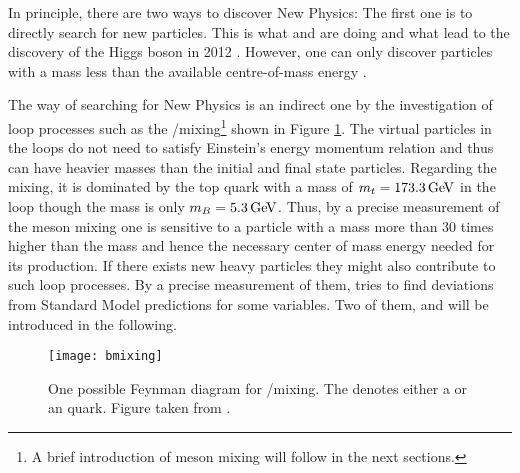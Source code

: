In principle, there are two ways to discover New Physics:
The first one is to directly search for new particles.
This is what \atlas and \cms are doing and what lead to the discovery of the Higgs boson in 2012 \cite{Higgs_ATLAS, Higgs_CMS}.
However, one can only discover particles with a mass less than the available centre-of-mass energy \sqs.

The \lhcb way of searching for New Physics is an indirect one by the investigation of loop processes such as the \B/\Bbar mixing\footnote{A brief introduction of meson mixing will follow in the next sections.} shown in Figure \ref{fig:Bmixing}.
The virtual particles in the loops do not need to satisfy Einstein's energy momentum relation and thus can have heavier masses than the initial and final state particles.
Regarding the \B mixing, it is dominated by the top quark with a mass of $m_t = 173.3 \mathrm{\,Ge\kern -0.1em V}$ in the loop though the \B mass is only $m_{B} = 5.3\mathrm{\,Ge\kern -0.1em V}$.
Thus, by a precise measurement of the \B meson mixing one is sensitive to a particle with a mass more than 30 times higher than the \B mass and hence the necessary center of mass energy needed for its production.
If there exists new heavy particles they might also contribute to such loop processes.
By a precise measurement of them, \lhcb tries to find deviations from Standard Model predictions for some variables.
Two of them, \asld and \Vub will be introduced in the following.
\begin{figure}[ptb]
    \centering
	\texttt{[image: bmixing]}	
	\caption{One possible Feynman diagram for \B/\Bbar mixing. The \quark denotes either a \dquark or an \squark quark. Figure taken from \cite{LHCb_roadmap}.}
	\label{fig:Bmixing}
\end{figure}

